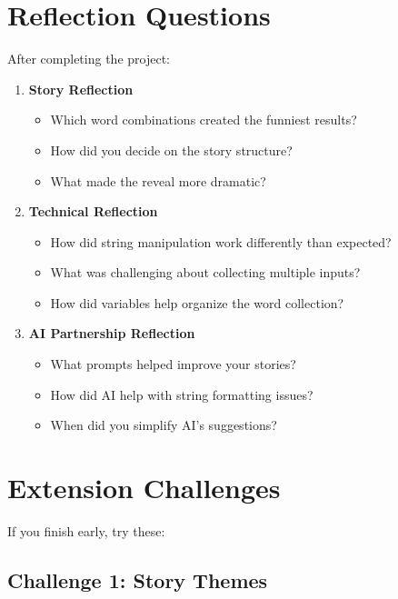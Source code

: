 \documentclass[
  letterpaper,
  DIV=11,
  numbers=noendperiod,
  oneside]{scrreprt}
\providecommand{\tightlist}{%
  \setlength{\itemsep}{0pt}\setlength{\parskip}{0pt}}\usepackage{longtable,booktabs,array}
\begin{document}
\section{Reflection Questions}\label{reflection-questions-1}

After completing the project:

\begin{enumerate}
\def\labelenumi{\arabic{enumi}.}
\tightlist
\item
  \textbf{Story Reflection}

  \begin{itemize}
  \tightlist
  \item
    Which word combinations created the funniest results?
  \item
    How did you decide on the story structure?
  \item
    What made the reveal more dramatic?
  \end{itemize}
\item
  \textbf{Technical Reflection}

  \begin{itemize}
  \tightlist
  \item
    How did string manipulation work differently than expected?
  \item
    What was challenging about collecting multiple inputs?
  \item
    How did variables help organize the word collection?
  \end{itemize}
\item
  \textbf{AI Partnership Reflection}

  \begin{itemize}
  \tightlist
  \item
    What prompts helped improve your stories?
  \item
    How did AI help with string formatting issues?
  \item
    When did you simplify AI's suggestions?
  \end{itemize}
\end{enumerate}

\section{Extension Challenges}\label{extension-challenges-1}

If you finish early, try these:

\subsection{Challenge 1: Story Themes}\label{challenge-1-story-themes}
\end{document}
